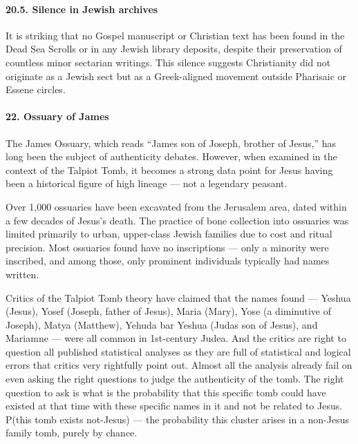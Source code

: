 \paragraph{20.5.
Silence in Jewish archives}\label{par:silence-in-jewish-archives}

It is striking that no Gospel manuscript or Christian text has been found in the Dead Sea Scrolls or in any Jewish library deposits, despite their preservation of countless minor sectarian writings. This silence suggests Christianity did not originate as a Jewish sect but as a Greek-aligned movement outside Pharisaic or Essene circles.

\paragraph{22.
Ossuary of James}\label{par:ossuary-of-james}

The James Ossuary, which reads ``James son of Joseph, brother of Jesus,'' has long been the subject of authenticity debates.
However, when examined in the context of the Talpiot Tomb, it becomes a strong data point for Jesus having been a historical figure of high lineage --- not a legendary peasant.

Over 1,000 ossuaries have been excavated from the Jerusalem area, dated within a few decades of Jesus's death.
The practice of bone collection into ossuaries was limited primarily to urban, upper-class Jewish families due to cost and ritual precision.
Most ossuaries found have no inscriptions --- only a minority were inscribed, and among those, only prominent individuals typically had names written.

Critics of the Talpiot Tomb theory have claimed that the names found --- Yeshua (Jesus), Yosef (Joseph, father of Jesus), Maria (Mary), Yose (a diminutive of Joseph), Matya (Matthew), Yehuda bar Yeshua (Judas son of Jesus), and Mariamne --- were all common in 1st-century Judea.
And the critics are right to question all published statistical analyses as they are full of statistical and logical errors that critics very rightfully point out.
Almost all the analysis already fail on even asking the right questions to judge the authenticity of the tomb.
The right question to ask is what is the probability that this specific tomb could have existed at that time with these specific names in it and not be related to Jesus.
P(this tomb exists \textbar{} not-Jesus) --- the probability this cluster arises in a non-Jesus family tomb, purely by chance.

